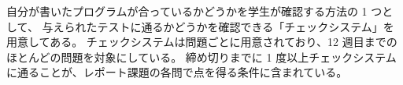 自分が書いたプログラムが合っているかどうかを学生が確認する方法の 1 つとして、
与えられたテストに通るかどうかを確認できる「チェックシステム」を用意してある。
チェックシステムは問題ごとに用意されており、12 週目までのほとんどの問題を対象にしている。
締め切りまでに 1 度以上チェックシステムに通ることが、レポート課題の各問で点を得る条件に含まれている。
